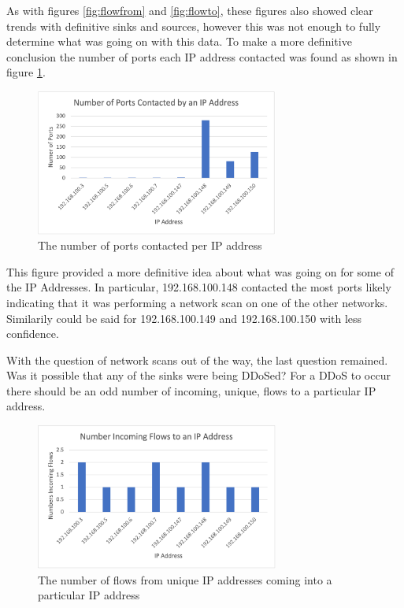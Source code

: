 \documentclass[conference]{IEEEtran}
\begin{document}
As with figures \ref{fig:flowfrom} and \ref{fig:flowto}, these figures also showed clear trends with definitive
sinks and sources, however this was not enough to fully determine what was going on with this data. To make a more
definitive conclusion the number of ports each IP address contacted was found as shown in figure \ref{fig:portscontacted}.

\begin{figure}[h]
    \includegraphics[width=8cm]{Figure5.png}
    \centering
    \caption{The number of ports contacted per IP address}
    \label{fig:portscontacted}
\end{figure}

This figure provided a more definitive idea about what was going on for some of the IP Addresses. In particular,
192.168.100.148 contacted the most ports likely indicating that it was performing a network scan on one of the
other networks. Similarily could be said for 192.168.100.149 and 192.168.100.150 with less confidence.

With the question of network scans out of the way, the last question remained.
Was it possible that any of the sinks were being DDoSed?
For a DDoS to occur there should be an odd number of incoming, unique, flows to a particular IP address. 

\begin{figure}[h]
    \includegraphics[width=8cm]{Figure6.png}
    \centering
    \caption{The number of flows from unique IP addresses coming into a particular IP address}
    \label{fig:incomingflows}
\end{figure}
\end{document}
